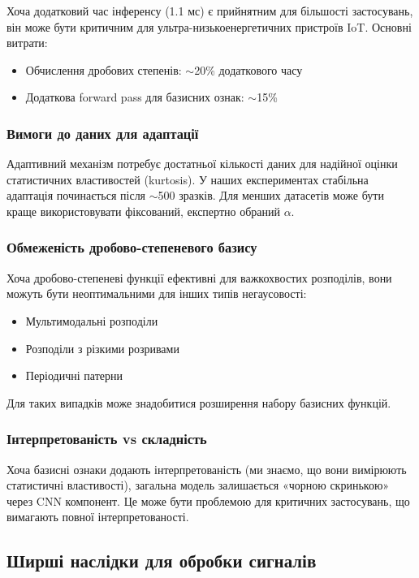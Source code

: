 \documentclass[12pt,a4paper]{article}
\begin{document}
Хоча додатковий час інференсу (1.1 мс) є прийнятним для більшості застосувань, він може бути критичним для ультра-низькоенергетичних пристроїв IoT. Основні витрати:
\begin{itemize}
	\item Обчислення дробових степенів: $\sim$20\% додаткового часу
	\item Додаткова forward pass для базисних ознак: $\sim$15\%
\end{itemize}

\subsubsection{Вимоги до даних для адаптації}

Адаптивний механізм потребує достатньої кількості даних для надійної оцінки статистичних властивостей (kurtosis). У наших експериментах стабільна адаптація починається після $\sim$500 зразків. Для менших датасетів може бути краще використовувати фіксований, експертно обраний $\alpha$.

\subsubsection{Обмеженість дробово-степеневого базису}

Хоча дробово-степеневі функції ефективні для важкохвостих розподілів, вони можуть бути неоптимальними для інших типів негаусовості:
\begin{itemize}
	\item Мультимодальні розподіли
	\item Розподіли з різкими розривами
	\item Періодичні патерни
\end{itemize}

Для таких випадків може знадобитися розширення набору базисних функцій.

\subsubsection{Інтерпретованість vs складність}

Хоча базисні ознаки додають інтерпретованість (ми знаємо, що вони вимірюють статистичні властивості), загальна модель залишається «чорною скринькою» через CNN компонент. Це може бути проблемою для критичних застосувань, що вимагають повної інтерпретованості.

\subsection{Ширші наслідки для обробки сигналів}
\end{document}
